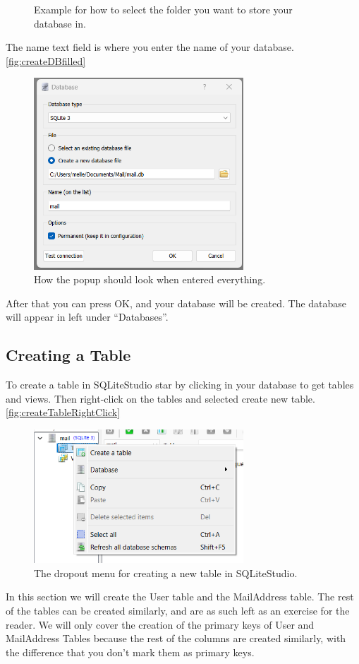 \documentclass[a4paper,11pt,oneside]{article}
\begin{document}
\begin{sloppypar}
\begin{figure}[!htb]
  \caption{Example for how to select the folder you want to store your database in.}
  \label{fig:createDBnavigate}
\end{figure}
The name text field is where you enter the name of your database. \autoref{fig:createDBfilled}
\begin{figure}[!htb]
  \centering
  \includegraphics[width=0.7\textwidth]{sqlitestudio/create_database/create_database_populated.png}
  \caption{How the popup should look when entered everything.}
  \label{fig:createDBfilled}
\end{figure}
After that you can press OK, and your database will be created. The database will appear in left under ``Databases''.

\subsection{Creating a Table}
\label{sqliteStudioCreatingTable}
To create a table in SQLiteStudio star by clicking in your database to get tables and views. Then right-click on the tables and selected create new table. \autoref{fig:createTableRightClick}

\begin{figure}[!htb]
  \centering
  \includegraphics[width=0.7\textwidth]{sqlitestudio/create_table/create_table_right_clicked.png}
  \caption{The dropout menu for creating a new table in SQLiteStudio.}
  \label{fig:createTableRightClick}
\end{figure}
In this section we will create the User table and the MailAddress table. The rest of the tables can be created similarly, and are as such left as an exercise for the reader. We will only cover the creation of the primary keys of User and MailAddress Tables because the rest of the columns are created similarly, with the difference that you don't mark them as primary keys.



\end{sloppypar}
\end{document}
